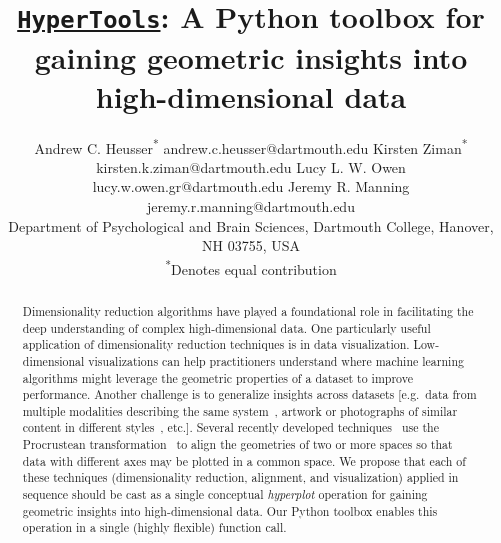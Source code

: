 \documentclass[twoside,11pt]{article}
\newcommand{\hypertools}{\href{https://github.com/ContextLab/hypertools}{\texttt{HyperTools}}}
\begin{document}
\title{\hypertools: A Python toolbox for gaining geometric insights into high-dimensional data}

\author{\name Andrew C. Heusser\textsuperscript{*} \email andrew.c.heusser@dartmouth.edu
       \AND
       \name Kirsten Ziman\textsuperscript{*} \email kirsten.k.ziman@dartmouth.edu
       \AND
       \name Lucy L. W. Owen \email lucy.w.owen.gr@dartmouth.edu
       \AND
       \name Jeremy R. Manning \email jeremy.r.manning@dartmouth.edu \\
       \addr Department of Psychological and Brain Sciences, 
       Dartmouth College, Hanover, NH 03755, USA\\
       \textsuperscript{*}Denotes equal contribution}
\editor{\vspace{-0.25in}}


\maketitle

\begin{abstract}%

Dimensionality reduction algorithms have played a foundational role in facilitating the deep understanding of complex high-dimensional data.  One particularly useful application of dimensionality reduction techniques is in data visualization.  Low-dimensional visualizations can help practitioners understand where machine learning algorithms might leverage the geometric properties of a dataset to improve performance.  Another challenge is to generalize insights across datasets [e.g.\ data from multiple modalities describing the same system~\citep{HaxbEtal11}, artwork or photographs of similar content in different styles~\citep{ZhuEtal17}, etc.].  Several recently developed techniques~\citep[e.g.][]{HaxbEtal11, ChenEtal15} use the Procrustean transformation~\citep{Scho66} to align the geometries of two or more spaces so that data with different axes may be plotted in a common space.  We propose that each of these techniques (dimensionality reduction, alignment, and visualization) applied in sequence should be cast as a single conceptual \textit{hyperplot} operation for gaining geometric insights into high-dimensional data.  Our Python toolbox enables this operation in a single (highly flexible) function call.

\end{abstract}
\end{document}
